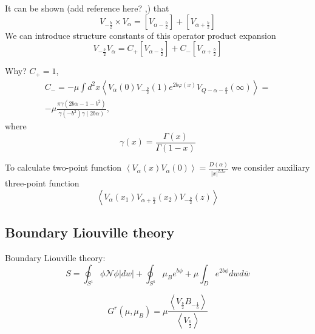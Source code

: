 \documentclass[12pt]{article}
\begin{document}
It can be shown (add reference here? \cite{nakayama2004liouville},\cite{teschner2001liouville}) that 
\begin{equation}
  \label{eq:34}
  V_{-\frac{b}{2}}\times V_{\alpha}= [V_{\alpha-\frac{b}{2}}]+[V_{\alpha+\frac{b}{2}}]
\end{equation}
We can introduce structure constants of this operator product expansion \cite{fateev2000boundary}
\begin{equation}
  \label{eq:35}
   V_{-\frac{b}{2}} V_{\alpha}= C_{+}[V_{\alpha-\frac{b}{2}}]+C_{-}[V_{\alpha+\frac{b}{2}}]
\end{equation}

Why? $C_{+}=1$,
\begin{multline}
  \label{eq:36}
  C_{-}=-\mu\int d^{2}x \left<V_{\alpha}(0)V_{-\frac{b}{2}}(1) e^{2b\varphi(x)}
    V_{Q-\alpha-\frac{b}{2}}(\infty)\right>=\\
  -\mu\frac{\pi\gamma(2b\alpha-1-b^{2})}{\gamma(-b^{2})\gamma(2b\alpha)},
\end{multline}
where
\begin{equation}
  \label{eq:37}
  \gamma(x)=\frac{\Gamma(x)}{\Gamma(1-x)}
\end{equation}

To calculate two-point function
$\left<V_{\alpha}(x)V_{\alpha}(0)\right>=\frac{D(\alpha)}{|x|^{2\Delta_{\alpha}}}$ we consider
auxiliary three-point function
\begin{equation}
  \label{eq:38}
  \left<V_{\alpha}(x_{1})V_{\alpha+\frac{b}{2}}(x_{2})V_{-\frac{b}{2}}(z)\right>
\end{equation}



\subsection{Boundary Liouville theory}
\label{sec:bound-liouv-theory}



Boundary Liouville theory:
\begin{equation}
  \label{eq:12}
  S=\oint_{S^{1}} \phi \mathcal{N} \phi |dw| + \oint_{S^{1}} \mu_{B} e^{b\phi} + \mu\int_{D} e^{2b\phi} dw d\bar{w}
\end{equation}

\begin{equation}
  \label{eq:11}
  G^{r}(\mu,\mu_{B}) = \mu \frac{\left<V_{\frac{b}{2}} B_{-\frac{1}{b}}\right>}{\left<V_{\frac{b}{2}}\right>}
\end{equation}
\end{document}
